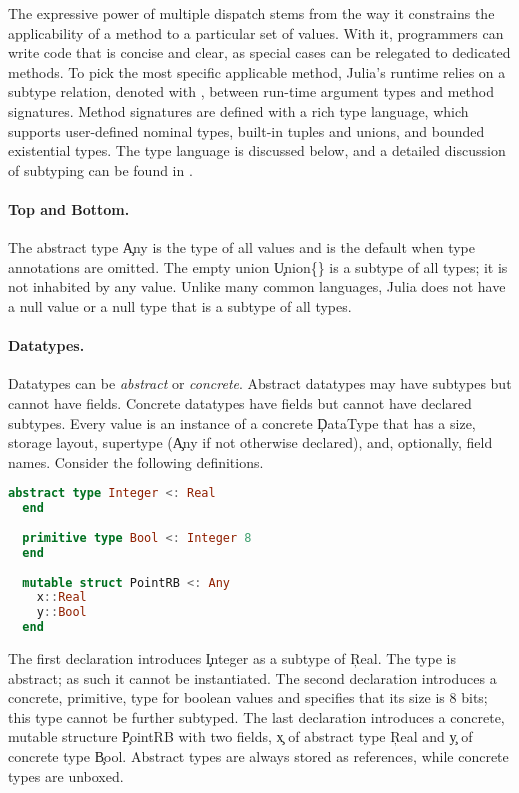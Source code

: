 The expressive power of multiple dispatch
stems from the way it constrains the applicability of a method to a
particular set of values.  With it, programmers can write code that is
concise and clear, as special cases can be relegated to dedicated methods.
To pick the most specific applicable method, Julia's runtime relies on a subtype
relation, denoted with \code{<:}, between run-time argument types and method signatures.
Method signatures are defined with a rich type language, which supports
user-defined nominal types, built-in tuples and unions, and bounded existential types. 
The type language is discussed below, and a detailed discussion of subtyping can
be found in \cite{oopsla18b}.

\paragraph{Top and Bottom.} The abstract type \c{Any} is the
type of all values and is the default when type annotations are omitted.
The empty union \c{Union\{\}} is a subtype of all types; it is not
inhabited by any value.  Unlike many common languages, Julia does not have a
null value or a null type that is a subtype of all types.

\paragraph{Datatypes.} 
Datatypes can be \emph{abstract} or \emph{concrete}. Abstract datatypes may
have subtypes but cannot have fields. Concrete datatypes have fields but
cannot have declared subtypes.  Every value is an instance of a concrete
\c{DataType} that has a size, storage layout, supertype (\c{Any} if
not otherwise declared), and, optionally, field names.  Consider
the following definitions.
\begin{lstlisting}[language=julia]
  abstract type Integer <: Real
  end
  
  primitive type Bool <: Integer 8
  end
  
  mutable struct PointRB <: Any
    x::Real
    y::Bool
  end
\end{lstlisting}
\noindent The first declaration introduces \c{Integer} as a subtype of
\c{Real}. The type is abstract; as such it cannot be instantiated.  The
second declaration introduces a concrete, primitive, type for boolean values
and specifies that its size is 8 bits; this type cannot be further subtyped.
The last declaration introduces a concrete, mutable structure \c{PointRB} with two
fields, \c{x} of abstract type \c{Real} and \c{y} of concrete type
\c{Bool}.  Abstract types are always stored as references, while concrete
types are unboxed.

